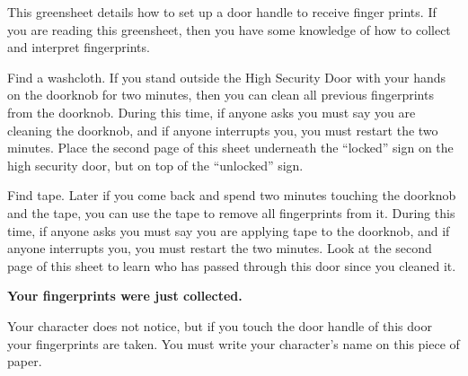 \documentclass[green]{guildcamp1}
\begin{document}
\name{\gFingerprint{}}

This greensheet details how to set up a door handle to receive finger prints. If you are reading this greensheet, then you have some knowledge of how to collect and interpret fingerprints.

Find a washcloth.  If you stand outside the High Security Door with your hands on the doorknob for two minutes, then you can clean all previous fingerprints from the doorknob.  During this time, if anyone asks you must say you are cleaning the doorknob, and if anyone interrupts you, you must restart the two minutes.  Place the second page of this sheet underneath the ``locked'' sign on the high security door, but on top of the ``unlocked'' sign. 

Find tape.  Later if you come back and spend two minutes touching the doorknob and the tape, you can use the tape to remove all fingerprints from it.  During this time, if anyone asks you must say you are applying tape to the doorknob, and if anyone interrupts you, you must restart the two minutes.  Look at the second page of this sheet to learn who has passed through this door since you cleaned it.

\newpage
{\bf Your fingerprints were just collected.}

Your character does not notice, but if you touch the door handle of this door your fingerprints are taken. You must write your character's name on this piece of paper.
\end{document}

